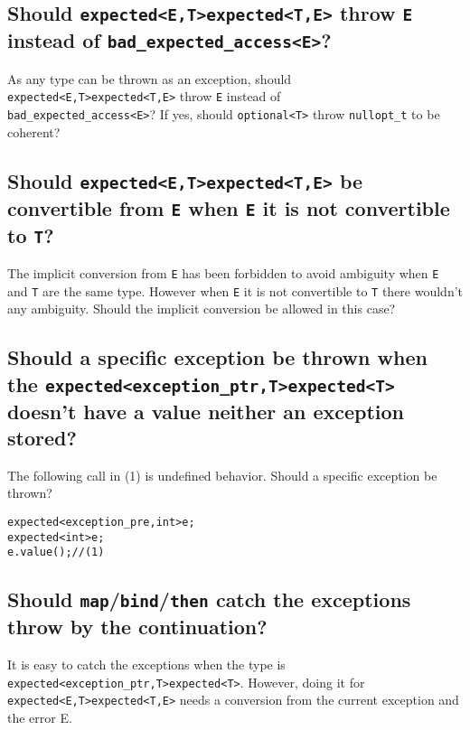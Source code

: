\documentclass[a4paper,10pt]{article}
\newcommand{\cpp}[1]{\lstinline{#1}}
\newcommand{\suppress}[1]{\colorbox{suppress_color}{#1}}
\newcommand{\update}[1]{\colorbox{update_color}{#1}}
\begin{document}
\subsection{Should \suppress{\cpp{expected<E,T>}}\update{\cpp{expected<T,E>}} throw \cpp{E} instead of \cpp{bad_expected_access<E>}?}

As any type can be thrown as an exception, should \suppress{\cpp{expected<E,T>}}\update{\cpp{expected<T,E>}} throw \cpp{E} instead of \\
\cpp{bad_expected_access<E>}? 
If yes, should \cpp{optional<T>} throw \cpp{nullopt_t} to be coherent? 

\subsection{Should \suppress{\cpp{expected<E,T>}}\update{\cpp{expected<T,E>}} be convertible from \cpp{E} when \cpp{E} it is not convertible to \cpp{T}?}

The implicit conversion from \cpp{E} has been forbidden to avoid ambiguity when \cpp{E} and \cpp{T} are the same type. 
However when \cpp{E} it is not convertible to \cpp{T} there wouldn't any ambiguity. 
Should the implicit conversion be allowed in this case?

\subsection{Should a specific exception be thrown when the \suppress{\cpp{expected<exception_ptr,T>}}\update{\cpp{expected<T>}} doesn't have a value neither an exception stored?}

The following call in (1) is undefined behavior. Should a specific exception be thrown?

\begin{alltt}
\suppress{expected<exception_pre,int> e;}
\update{expected<int> e;}
e.value(); // (1)
\end{alltt}

\subsection{Should \cpp{map}/\cpp{bind}/\cpp{then} catch the exceptions throw by the continuation?}

It is easy to catch the exceptions when the type is \suppress{\cpp{expected<exception_ptr,T>}}\update{\cpp{expected<T>}}. However, doing it for \suppress{\cpp{expected<E,T>}}\update{\cpp{expected<T,E>}} needs a conversion from the current exception and the error E.
\end{document}
